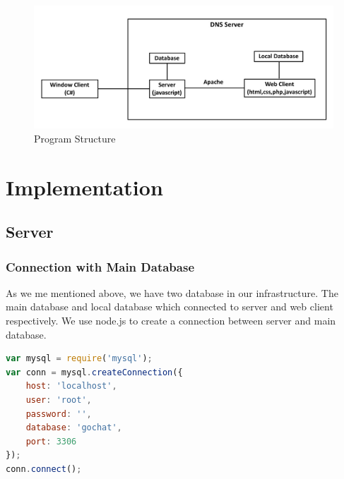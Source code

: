 \documentclass[a4paper,11pt]{article}
\begin{document}
\begin{figure}[h!]
\centering
\includegraphics[width = 0.8 \textwidth ]{program_structure.jpeg}
\caption{\label{fig:UML}Program Structure}
\end{figure}


















\section{Implementation}
\subsection{Server}
\subsubsection{Connection with Main Database}
As we me mentioned above, we have two database in our infrastructure. The main database and local database which connected to server and web client respectively. We use node.js to create a connection between server and main database.
\begin{lstlisting}[language=javascript]
var mysql = require('mysql');
var conn = mysql.createConnection({
    host: 'localhost',
    user: 'root',
    password: '',
    database: 'gochat',
    port: 3306
});
conn.connect();
\end{lstlisting}
\end{document}
